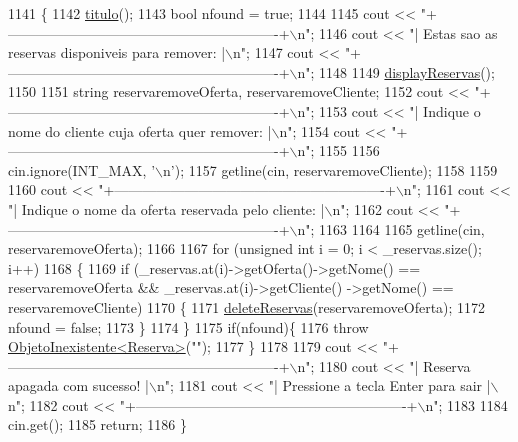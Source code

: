\begin{DoxyCode}
1141                              \{
1142     \hyperlink{classEmpresa_ad79f7196a8ce7256771cbd7b9542155c}{titulo}();
1143     \textcolor{keywordtype}{bool} nfound = \textcolor{keyword}{true};
1144 
1145     cout << \textcolor{stringliteral}{"+----------------------------------------------------------+\(\backslash\)n"};
1146     cout << \textcolor{stringliteral}{"| Estas sao as reservas disponiveis para remover:          |\(\backslash\)n"};
1147     cout << \textcolor{stringliteral}{"+----------------------------------------------------------+\(\backslash\)n"};
1148 
1149     \hyperlink{classEmpresa_a8c89e6053eaccf0e1938a4f2ab0bfdc4}{displayReservas}();
1150 
1151     \textcolor{keywordtype}{string} reservaremoveOferta, reservaremoveCliente;
1152     cout << \textcolor{stringliteral}{"+----------------------------------------------------------+\(\backslash\)n"};
1153     cout << \textcolor{stringliteral}{"| Indique o nome do cliente cuja oferta quer remover:      |\(\backslash\)n"};
1154     cout << \textcolor{stringliteral}{"+----------------------------------------------------------+\(\backslash\)n"};
1155 
1156     cin.ignore(INT\_MAX, \textcolor{charliteral}{'\(\backslash\)n'});
1157     getline(cin, reservaremoveCliente);
1158 
1159 
1160     cout << \textcolor{stringliteral}{"+----------------------------------------------------------+\(\backslash\)n"};
1161     cout << \textcolor{stringliteral}{"| Indique o nome da oferta reservada pelo cliente:         |\(\backslash\)n"};
1162     cout << \textcolor{stringliteral}{"+----------------------------------------------------------+\(\backslash\)n"};
1163 
1164 
1165     getline(cin, reservaremoveOferta);
1166 
1167     \textcolor{keywordflow}{for} (\textcolor{keywordtype}{unsigned} \textcolor{keywordtype}{int} i = 0; i < \_reservas.size(); i++)
1168     \{
1169         \textcolor{keywordflow}{if} (\_reservas.at(i)->getOferta()->getNome() == reservaremoveOferta && \_reservas.at(i)->getCliente()
      ->getNome() == reservaremoveCliente)
1170         \{
1171             \hyperlink{classEmpresa_a079c008b006f56faac3c1016fe770e8c}{deleteReservas}(reservaremoveOferta);
1172             nfound = \textcolor{keyword}{false};
1173         \}
1174     \}
1175     \textcolor{keywordflow}{if}(nfound)\{
1176         \textcolor{keywordflow}{throw} \hyperlink{classObjetoInexistente}{ObjetoInexistente<Reserva>}(\textcolor{stringliteral}{""});
1177     \}
1178 
1179     cout << \textcolor{stringliteral}{"+----------------------------------------------------------+\(\backslash\)n"};
1180     cout << \textcolor{stringliteral}{"| Reserva apagada com sucesso!                             |\(\backslash\)n"};
1181     cout << \textcolor{stringliteral}{"| Pressione a tecla Enter para sair                        |\(\backslash\)n"};
1182     cout << \textcolor{stringliteral}{"+----------------------------------------------------------+\(\backslash\)n"};
1183 
1184     cin.get();
1185     \textcolor{keywordflow}{return};
1186 \}
\end{DoxyCode}
